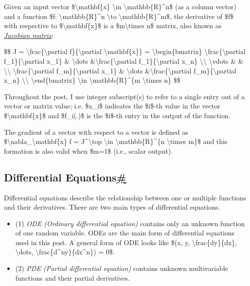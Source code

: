 Given an input vector \$\textbackslash mathbf\{x\} \textbackslash in \textbackslash mathbb\{R\}\^{}n\$ (as a column vector) and a function \$f: \textbackslash mathbb\{R\}\^{}n \textbackslash to \textbackslash mathbb\{R\}\^{}m\$, the derivative of \$f\$ with respective to \$\textbackslash mathbf\{x\}\$ is a \$m\textbackslash times n\$ matrix, also known as \href{https://en.wikipedia.org/wiki/Jacobian_matrix_and_determinant}{\emph{Jacobian matrix}}:

\$\$ J = \textbackslash frac\{\textbackslash partial f\}\{\textbackslash partial \textbackslash mathbf\{x\}\} = \textbackslash begin\{bmatrix\} \textbackslash frac\{\textbackslash partial f\_1\}\{\textbackslash partial x\_1\} \& \textbackslash dots \&\textbackslash frac\{\textbackslash partial f\_1\}\{\textbackslash partial x\_n\} \textbackslash\textbackslash{} \textbackslash vdots \& \& \textbackslash\textbackslash{} \textbackslash frac\{\textbackslash partial f\_m\}\{\textbackslash partial x\_1\} \& \textbackslash dots \&\textbackslash frac\{\textbackslash partial f\_m\}\{\textbackslash partial x\_n\} \textbackslash\textbackslash{} \textbackslash end\{bmatrix\} \textbackslash in \textbackslash mathbb\{R\}\^{}\{m \textbackslash times n\} \$\$

Throughout the post, I use integer subscript(s) to refer to a single entry out of a vector or matrix value; i.e. \$x\_i\$ indicates the \$i\$-th value in the vector \$\textbackslash mathbf\{x\}\$ and \$f\_i(.)\$ is the \$i\$-th entry in the output of the function.

The gradient of a vector with respect to a vector is defined as \$\textbackslash nabla\_\textbackslash mathbf\{x\} f = J\^{}\textbackslash top \textbackslash in \textbackslash mathbb\{R\}\^{}\{n \textbackslash times m\}\$ and this formation is also valid when \$m=1\$ (i.e., scalar output).

\subsection{\texorpdfstring{Differential Equations\hyperref[differential-equations]{\#}}{Differential Equations\#}}\label{differential-equations}

Differential equations describe the relationship between one or multiple functions and their derivatives. There are two main types of differential equations.

\begin{itemize}
\tightlist
\item
  (1) \emph{ODE (Ordinary differential equation)} contains only an unknown function of one random variable. ODEs are the main form of differential equations used in this post. A general form of ODE looks like \$(x, y, \textbackslash frac\{dy\}\{dx\}, \textbackslash dots, \textbackslash frac\{d\^{}ny\}\{dx\^{}n\}) = 0\$.
\item
  (2) \emph{PDE (Partial differential equation)} contains unknown multivariable functions and their partial derivatives.
\end{itemize}

